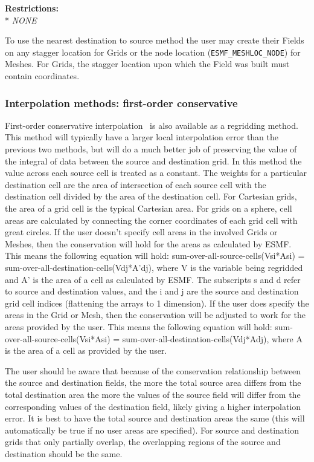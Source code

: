\smallskip

\textbf{Restrictions:}\\*
\textit{NONE}

\smallskip

 To use the nearest destination to source method the user may create their Fields on any stagger location for Grids or the node location ({\tt ESMF\_MESHLOC\_NODE}) for Meshes.
 For Grids, the stagger location upon which the Field was built must contain coordinates. 


\subsubsection{Interpolation methods: first-order conservative}\label{sec:interpolation:conserve}
 First-order conservative interpolation~\cite{ConservativeOrder1} is also available as a regridding method. This method 
 will typically have  
 a larger local interpolation error than the previous two methods, but will do a much better job of preserving the value
 of the  integral of data between the source and destination grid. In this method the value across each source cell
 is treated as a constant. The weights for a particular destination cell are the area of intersection of each 
 source cell with the destination cell divided by the area of the destination cell. For Cartesian grids, the area of a grid cell is the typical Cartesian area. 
 For grids on a sphere, cell areas are calculated by connecting the corner coordinates of each grid cell with great circles. If the user doesn't specify
 cell areas in the involved Grids or Meshes, then the conservation will hold for the areas as calculated by 
 ESMF. This means the following equation will hold:  sum-over-all-source-cells(Vsi*Asi) = sum-over-all-destination-cells(Vdj*A'dj), where
 V is the variable being regridded and A' is the area of a cell as calculated by ESMF.  The subscripts s and d refer to source and destination values, and the i and j are the source 
 and destination grid cell indices (flattening the arrays to 1 dimension). If the user does specify the areas in the Grid or Mesh, then the conservation will be adjusted to work for the areas 
 provided by the user. This means the following equation will hold:  sum-over-all-source-cells(Vsi*Asi) = sum-over-all-destination-cells(Vdj*Adj),
 where A is the area of a cell as provided by the user. 

 The user should be aware that because of the conservation relationship between the source and destination fields, the more the total source area
 differs from the total destination area the more the values of the source field will differ from the corresponding values of the destination field, likely giving a higher 
 interpolation error. It is best to have the total source and destination areas the same (this will automatically be true if no user areas are specified). For source and destination grids 
 that only partially overlap, the overlapping regions of the source and destination should be the same.

